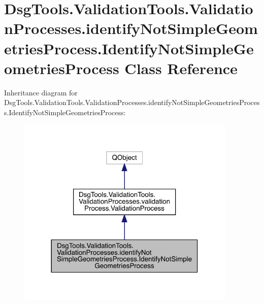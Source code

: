 \hypertarget{class_dsg_tools_1_1_validation_tools_1_1_validation_processes_1_1identify_not_simple_geometries_cc91ad4d87ecabb6a33270acc62526dc}{}\section{Dsg\+Tools.\+Validation\+Tools.\+Validation\+Processes.\+identify\+Not\+Simple\+Geometries\+Process.\+Identify\+Not\+Simple\+Geometries\+Process Class Reference}
\label{class_dsg_tools_1_1_validation_tools_1_1_validation_processes_1_1identify_not_simple_geometries_cc91ad4d87ecabb6a33270acc62526dc}


Inheritance diagram for Dsg\+Tools.\+Validation\+Tools.\+Validation\+Processes.\+identify\+Not\+Simple\+Geometries\+Process.\+Identify\+Not\+Simple\+Geometries\+Process\+:
\nopagebreak
\begin{figure}[H]
\begin{center}
\leavevmode
\includegraphics[width=296pt]{class_dsg_tools_1_1_validation_tools_1_1_validation_processes_1_1identify_not_simple_geometries_d1c8e35a674a053af3a788bd0c288feb}
\end{center}
\end{figure}


